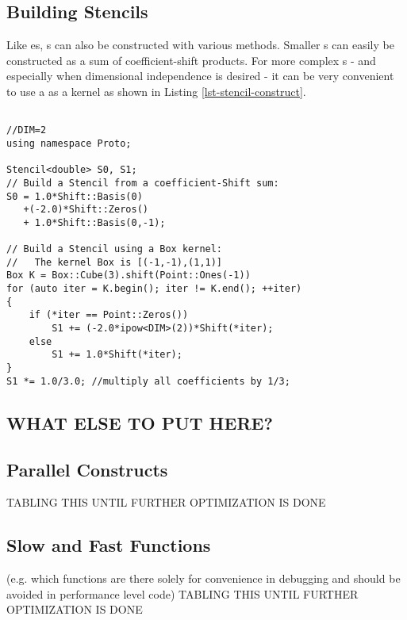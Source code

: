 \documentclass[12pt]{article}
\begin{document}
\subsection{Building Stencils}

Like es, s can also be constructed with various methods. Smaller s can easily be constructed as a sum of coefficient-shift products. For more complex s - and especially when dimensional independence is desired - it can be very convenient to use a  as a kernel as shown in Listing \ref{lst-stencil-construct}. 

\begin{lstlisting}[label=lst-stencil-construct, caption=Stencil Construction Methods]

//DIM=2
using namespace Proto;

Stencil<double> S0, S1;
// Build a Stencil from a coefficient-Shift sum:
S0 = 1.0*Shift::Basis(0)
   +(-2.0)*Shift::Zeros()
   + 1.0*Shift::Basis(0,-1);
   
// Build a Stencil using a Box kernel:
//   The kernel Box is [(-1,-1),(1,1)]
Box K = Box::Cube(3).shift(Point::Ones(-1)) 
for (auto iter = K.begin(); iter != K.end(); ++iter)
{
	if (*iter == Point::Zeros())
		S1 += (-2.0*ipow<DIM>(2))*Shift(*iter);
	else
		S1 += 1.0*Shift(*iter);
}
S1 *= 1.0/3.0; //multiply all coefficients by 1/3;

\end{lstlisting}

\subsection{WHAT ELSE TO PUT HERE?}

\subsection{Parallel Constructs}
TABLING THIS UNTIL FURTHER OPTIMIZATION IS DONE

\subsection{Slow and Fast Functions}
(e.g. which functions are there solely for convenience in debugging and should be avoided in performance level code)
TABLING THIS UNTIL FURTHER OPTIMIZATION IS DONE
\end{document}
